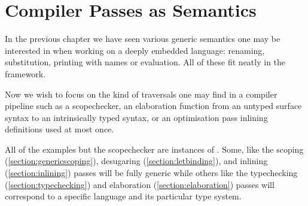 \chapter{Compiler Passes as Semantics}

In the previous chapter we have seen various generic semantics one may be
interested in when working on a deeply embedded language: renaming,
substitution, printing with names or evaluation. All of these fit neatly
in the  framework.

Now we wish to focus on the kind of traversals one may find in a compiler
pipeline such as a scopechecker, an elaboration function from an untyped
surface syntax to an intrinsically typed syntax, or an optimisation pass
inlining definitions used at most once.

All of the examples but the scopechecker are instances of .
Some, like the scoping (\cref{section:genericscoping}), desugaring
(\cref{section:letbinding}), and inlining (\cref{section:inlining}) passes
will be fully generic while others like the typechecking
(\cref{section:typechecking}) and elaboration (\cref{section:elaboration})
passes will correspond to a specific language and its particular type
system.






